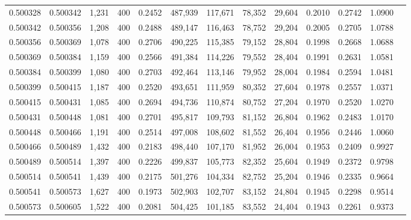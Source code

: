 \begin{tabular}{rrrrrrrrrrrrr}
0.500328 & 0.500342 & 1,231 & 400 &                                     0.2452 & 487,939 & 117,671 &  78,352 &  29,604 & 0.2010 & 0.2742 & 1.0900 \\
0.500342 & 0.500356 & 1,208 & 400 &                                     0.2488 & 489,147 & 116,463 &  78,752 &  29,204 & 0.2005 & 0.2705 & 1.0788 \\
0.500356 & 0.500369 & 1,078 & 400 &                                     0.2706 & 490,225 & 115,385 &  79,152 &  28,804 & 0.1998 & 0.2668 & 1.0688 \\
0.500369 & 0.500384 & 1,159 & 400 &                                     0.2566 & 491,384 & 114,226 &  79,552 &  28,404 & 0.1991 & 0.2631 & 1.0581 \\
0.500384 & 0.500399 & 1,080 & 400 &                                     0.2703 & 492,464 & 113,146 &  79,952 &  28,004 & 0.1984 & 0.2594 & 1.0481 \\
0.500399 & 0.500415 & 1,187 & 400 &                                     0.2520 & 493,651 & 111,959 &  80,352 &  27,604 & 0.1978 & 0.2557 & 1.0371 \\
0.500415 & 0.500431 & 1,085 & 400 &                                     0.2694 & 494,736 & 110,874 &  80,752 &  27,204 & 0.1970 & 0.2520 & 1.0270 \\
0.500431 & 0.500448 & 1,081 & 400 &                                     0.2701 & 495,817 & 109,793 &  81,152 &  26,804 & 0.1962 & 0.2483 & 1.0170 \\
0.500448 & 0.500466 & 1,191 & 400 &                                     0.2514 & 497,008 & 108,602 &  81,552 &  26,404 & 0.1956 & 0.2446 & 1.0060 \\
0.500466 & 0.500489 & 1,432 & 400 &                                     0.2183 & 498,440 & 107,170 &  81,952 &  26,004 & 0.1953 & 0.2409 & 0.9927 \\
0.500489 & 0.500514 & 1,397 & 400 &                                     0.2226 & 499,837 & 105,773 &  82,352 &  25,604 & 0.1949 & 0.2372 & 0.9798 \\
0.500514 & 0.500541 & 1,439 & 400 &                                     0.2175 & 501,276 & 104,334 &  82,752 &  25,204 & 0.1946 & 0.2335 & 0.9664 \\
0.500541 & 0.500573 & 1,627 & 400 &                                     0.1973 & 502,903 & 102,707 &  83,152 &  24,804 & 0.1945 & 0.2298 & 0.9514 \\
0.500573 & 0.500605 & 1,522 & 400 &                                     0.2081 & 504,425 & 101,185 &  83,552 &  24,404 & 0.1943 & 0.2261 & 0.9373 \\

\end{tabular}
